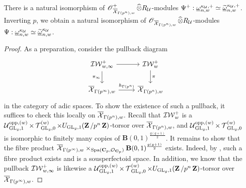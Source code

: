 \begin{Proposition}\label{Proposition: omega is admissible}
There is a natural isomorphism of $\operatorname{\mathscr{O}}^+_{\overline{\operatorname{\mathcal{X}}}_{\Gamma(p^n),w}}\widehat{\otimes}R_{\operatorname{\mathcal{U}}}$-modules $\Psi^+: \underline{\omega}^{\kappa_{\operatorname{\mathcal{U}}},+}_{n,w}\simeq \widetilde{\underline{\omega}}^{\kappa_{\operatorname{\mathcal{U}}},+}_{n,w}$. Inverting $p$, we obtain a natural isomorphism of $\operatorname{\mathscr{O}}_{\overline{\operatorname{\mathcal{X}}}_{\Gamma(p^n),w}}\widehat{\otimes}R_{\operatorname{\mathcal{U}}}$-modules $\Psi: \underline{\omega}^{\kappa_{\operatorname{\mathcal{U}}}}_{n,w}\simeq \widetilde{\underline{\omega}}^{\kappa_{\operatorname{\mathcal{U}}}}_{n,w}$.
\end{Proposition}

\begin{proof}As a preparation, consider the pullback diagram \[
    \begin{tikzcd}
        \adicIW_{w, \infty}^+ \arrow[r]\arrow[d, "\pi_{\infty}"'] & \adicIW_w^+\arrow[d, "\pi"]\\
        \overline{\calX}_{\Gamma(p^{\infty}),w} \arrow[r, "h_{\Gamma(p^n)}"] & \overline{\calX}_{\Gamma(p^n),w}
    \end{tikzcd}
\]
in the category of adic spaces. To show the existence of such a pullback, it suffices to check this locally on $\overline{\operatorname{\mathcal{X}}}_{\Gamma(p^n),w}$. Recall that $\operatorname{\mathcal{IW}}_w^+$ is a $\operatorname{\mathcal{U}}_{\operatorname{GL}_g, 1}^{\operatorname{opp}, (w)}\times \operatorname{\mathcal{T}}_{\operatorname{GL}_g,0}^{(w)}\times U_{\operatorname{GL}_g,1}(\operatorname{\mathbf{Z}}/p^n\operatorname{\mathbf{Z}})$-torsor over $\overline{\operatorname{\mathcal{X}}}_{\Gamma(p^n),w}$, and $\operatorname{\mathcal{U}}_{\operatorname{GL}_g, 1}^{\operatorname{opp}, (w)}\times \operatorname{\mathcal{T}}_{\operatorname{GL}_g,0}^{(w)}$ is isomorphic to finitely many copies of $\mathbf{B}(0,1)^{\frac{g(g+1)}{2}}$. It remains to show that the fibre product $\overline{\operatorname{\mathcal{X}}}_{\Gamma(p^{\infty}),w}\times_{\operatorname{Spa}(\operatorname{\mathbf{C}}_p, \operatorname{\mathcal{O}}_{\operatorname{\mathbf{C}}_p})} \mathbf{B}(0,1)^{\frac{g(g+1)}{2}}$ exists. Indeed, by \cite[Proposition 6.3.3 (3)]{Scholze-Weinstein-Berkeley}, such a fibre product exists and is a sousperfectoid space. In addition, we know that the pullback $\operatorname{\mathcal{IW}}_{w, \infty}^+$ is likewise a $\operatorname{\mathcal{U}}_{\operatorname{GL}_g, 1}^{\operatorname{opp}, (w)}\times \operatorname{\mathcal{T}}_{\operatorname{GL}_g,0}^{(w)}\times U_{\operatorname{GL}_g,1}(\operatorname{\mathbf{Z}}/p^n\operatorname{\mathbf{Z}})$-torsor over $\overline{\operatorname{\mathcal{X}}}_{\Gamma(p^{\infty}),w}$. 


\end{proof}
